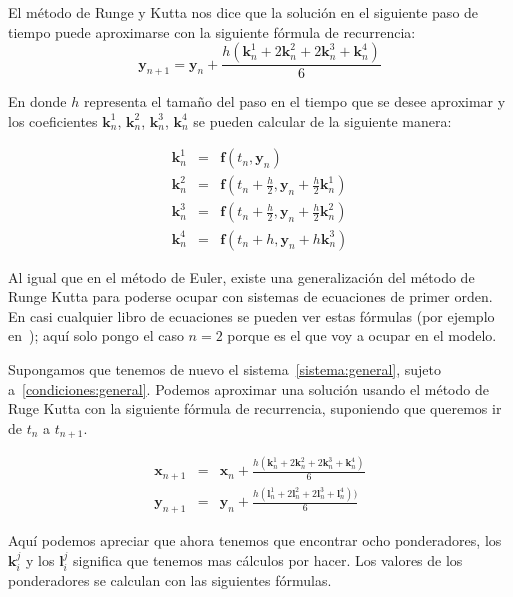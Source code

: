 El método de Runge y Kutta nos dice que la solución en el siguiente paso de tiempo puede aproximarse con la siguiente fórmula de recurrencia:
$$\textbf{y}_{n+1} = \textbf{y}_n + \frac{h \left(\textbf{k}_{n}^{1} + 2\textbf{k}_{n}^{2} + 2\textbf{k}_{n}^{3} + \textbf{k}_{n}^{4} \right)}{6} $$
 
En donde $h$ representa el tamaño del paso en el tiempo que se desee aproximar y los coeficientes $\textbf{k}_{n}^{1}$, $\textbf{k}_{n}^{2}$, $\textbf{k}_{n}^{3}$, $\textbf{k}_{n}^{4}$ se pueden calcular de la siguiente manera:

\begin{eqnarray}
\textbf{k}_{n}^{1} & = & \textbf{f}(t_n, \textbf{y}_n) \nonumber \\
\textbf{k}_{n}^{2} & = & \textbf{f}(t_n + \frac{h}{2}, \textbf{y}_n + \frac{h}{2} \textbf{k}_{n}^{1}) \nonumber \\
\textbf{k}_{n}^{3} & = & \textbf{f}(t_n + \frac{h}{2}, \textbf{y}_n + \frac{h}{2} \textbf{k}_{n}^{2}) \nonumber \\
\textbf{k}_{n}^{4} & = & \textbf{f}(t_n + h, \textbf{y}_n + h\textbf{k}_{n}^{3}) \nonumber
\end{eqnarray}

Al igual que en el método de Euler, existe una generalización del método de Runge Kutta para poderse ocupar con sistemas de ecuaciones de primer orden.
En casi cualquier libro de ecuaciones se pueden ver estas fórmulas (por ejemplo en~\cite{Blanchard:Ecuaciones}); aquí solo pongo el caso $n=2$ porque es el que voy a ocupar en el modelo.

Supongamos que tenemos de nuevo el sistema~\eqref{sistema:general}, sujeto a~\eqref{condiciones:general}.
Podemos aproximar una solución usando el método de Ruge Kutta con la siguiente fórmula de recurrencia, suponiendo que queremos ir de $t_n$ a $t_{n+1}$.

\begin{eqnarray}
\textbf{x}_{n+1} & = & \textbf{x}_n + \frac{h(\textbf{k}_{n}^{1} + 2\textbf{k}_{n}^{2} + 2\textbf{k}_{n}^{3} + \textbf{k}_{n}^{4})}{6} \nonumber \\
\textbf{y}_{n+1} & = & \textbf{y}_n + \frac{h(\textbf{l}_{n}^{1} + 2\textbf{l}_{n}^{2} + 2\textbf{l}_{n}^{3} + \textbf{l}_{n}^{4}))}{6} \nonumber
\end{eqnarray}

Aquí podemos apreciar que ahora tenemos que encontrar ocho ponderadores, los $\textbf{k}_{i}^{j}$ y los $\textbf{l}_{i}^{j}$ significa que tenemos mas cálculos por hacer.
Los valores de los ponderadores se calculan con las siguientes fórmulas.

